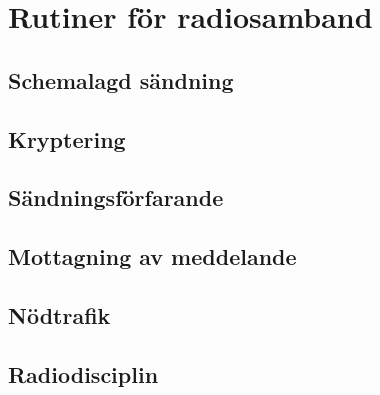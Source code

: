 \chapter{Rutiner för radiosamband}

\section{Schemalagd sändning}

\section{Kryptering}

\section{Sändningsförfarande}

\section{Mottagning av meddelande}

\section{Nödtrafik}

\section{Radiodisciplin}
